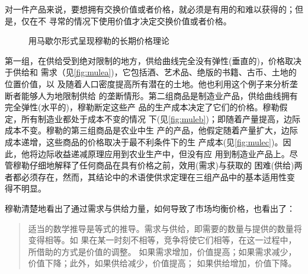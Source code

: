对一件产品来说，要想拥有交换价值或者价格，就必须是有用的和难以获得的；但是，仅在不
寻常的情况下使用价值才决定交换价值或者价格。


\begin{figure}[ht]
  \centering
  \hfill
  \hfill
  \caption{用马歇尔形式呈现穆勒的长期价格理论}
  \label{fig:mulema}
\end{figure}

第一组，在供给受到绝对限制的地方，供给曲线完全没有弹性(垂直的)，价格取决于供给和
需求（见\cref{fig:mulea})，它包括酒、艺术品、绝版的书籍、古币、土地的位置价值，以
及随着人口密度提高所有潜在的土地。他也利用这个例子来分析垄断者能够人为地限制供给
的垄断情形。第二组商品是制造业产品，供给曲线拥有完全弹性(水平的)，穆勒断定这些产
品的生产成本决定了它们的价格。穆勒假定，所有制造业都处于成本不变的情况
下(见\cref{fig:muleb})；即随着产量提高，边际成本不变。穆勒的第三组商品是农业中生
产的产品，他假定随着产量扩大，边际成本递增，这些商品的价格取决于最不利条件下的生
产成本(见\cref{fig:mulec})。因此，他将边际收益递减原理应用到农业生产中，但没有应
用到制造业产品上。尽管穆勒仔细地解释了任何商品在具有价格之前，效用(需求)与获取的
困难(供给)两者都必须存在，然而，其结论中的术语使供求定理在三组产品中的基本适用性变
得不明显。

穆勒清楚地看出了通过需求与供给力量，如何导致了市场均衡价格，也看出了：
\begin{quotation}
  适当的数学推导是等式的推导。需求与供给，即需要的数量与提供的数量将变得相等。如
  果在某一时刻不相等，竞争将使它们相等，在这一过程中，所借助的方式是价值的调整。
  如果需求增加，价值提高；如果需求减少，价值下降；此外，如果供给减少，价值提高；
  如果供给增加，价值下降。
\end{quotation}

